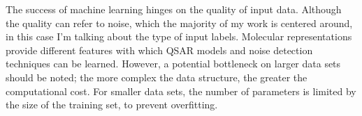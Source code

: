 The success of machine learning hinges on the quality of input data. Although the quality can refer to noise, which the majority of my work is centered around, in this case I'm talking about the type of input labels. Molecular representations provide different features with which QSAR models and noise detection techniques can be learned. However, a potential bottleneck on larger data sets should be noted; the more complex the data structure, the greater the computational cost. For smaller data sets, the number of parameters is limited by the size of the training set, to prevent overfitting. 

